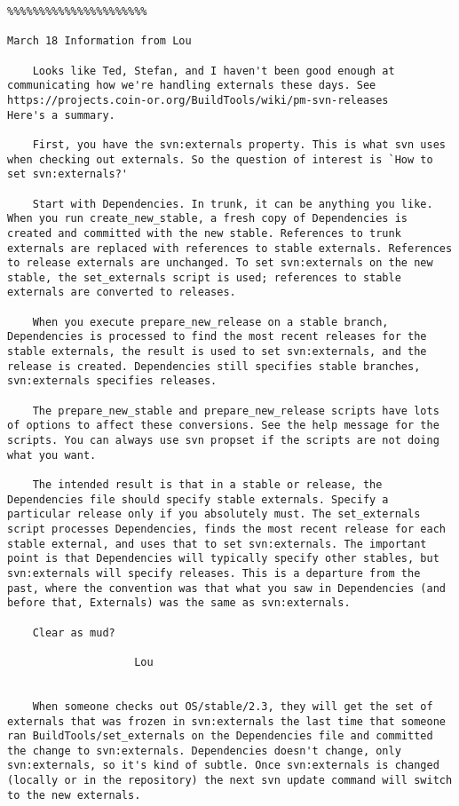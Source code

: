 \begin{verbatim}
%%%%%%%%%%%%%%%%%%%%%%

March 18 Information from Lou

    Looks like Ted, Stefan, and I haven't been good enough at communicating how we're handling externals these days. See
https://projects.coin-or.org/BuildTools/wiki/pm-svn-releases
Here's a summary.

    First, you have the svn:externals property. This is what svn uses when checking out externals. So the question of interest is `How to set svn:externals?'

    Start with Dependencies. In trunk, it can be anything you like. When you run create_new_stable, a fresh copy of Dependencies is created and committed with the new stable. References to trunk externals are replaced with references to stable externals. References to release externals are unchanged. To set svn:externals on the new stable, the set_externals script is used; references to stable externals are converted to releases.

    When you execute prepare_new_release on a stable branch, Dependencies is processed to find the most recent releases for the stable externals, the result is used to set svn:externals, and the release is created. Dependencies still specifies stable branches, svn:externals specifies releases.

    The prepare_new_stable and prepare_new_release scripts have lots of options to affect these conversions. See the help message for the scripts. You can always use svn propset if the scripts are not doing what you want.

    The intended result is that in a stable or release, the Dependencies file should specify stable externals. Specify a particular release only if you absolutely must. The set_externals script processes Dependencies, finds the most recent release for each stable external, and uses that to set svn:externals. The important point is that Dependencies will typically specify other stables, but svn:externals will specify releases. This is a departure from the past, where the convention was that what you saw in Dependencies (and before that, Externals) was the same as svn:externals.

    Clear as mud?

                    Lou 


    When someone checks out OS/stable/2.3, they will get the set of externals that was frozen in svn:externals the last time that someone ran BuildTools/set_externals on the Dependencies file and committed the change to svn:externals. Dependencies doesn't change, only svn:externals, so it's kind of subtle. Once svn:externals is changed (locally or in the repository) the next svn update command will switch to the new externals.


\end{verbatim}

